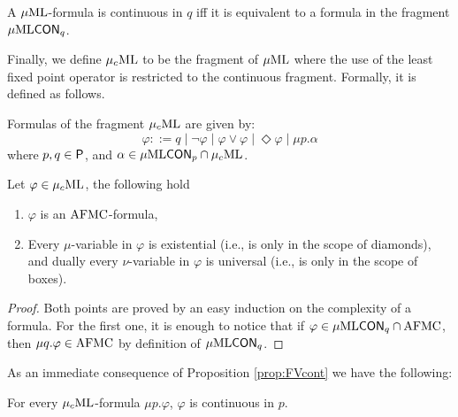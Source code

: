 \begin{proposition}\label{prop:FVcont}
A $\mu\mathrm{ML}$-formula is continuous in $q$ iff it is equivalent to a formula in the fragment $\mu\mathrm{ML}\mathsf{CON}_{q}$.
\end{proposition}

Finally, we define $\mu_{c}\textup{ML}$ to be the fragment of $\mu\mathrm{ML}$ where the use of the least fixed point operator is restricted to the continuous fragment. Formally, it is defined as follows.

\begin{definition}
Formulas of the fragment $\mu_{c}\textup{ML}$ are given by:%
\begin{equation*}
   \varphi ::= q \mid \lnot \varphi
    \mid \varphi \lor \varphi
    \mid \Diamond \varphi
    \mid \mu p.\alpha
\end{equation*}
%
where $p,q \in \mathsf{P}$, and $\alpha \in \mu\mathrm{ML}\mathsf{CON}_{p} \cap \mu_{c}\textup{ML}$.
\end{definition}

\begin{proposition}
Let $\varphi \in \mu_{c}\textup{ML}$, the following hold
\begin{enumerate}[(1)]
\itemsep 0pt
\item $\varphi$ is an $\mathrm{AFMC}$-formula,
\item Every $\mu$-variable in $\varphi$ is existential (i.e., is only in the scope of diamonds), and dually every $\nu$-variable in $\varphi$ is universal (i.e., is only in the scope of boxes).
\end{enumerate}
\end{proposition}
\begin{proof}
Both points are proved by an easy induction on the complexity of a formula. For the first one,  it is enough to notice that if $\varphi \in \mu\mathrm{ML}\mathsf{CON}_{q} \cap \mathrm{AFMC}$, then $\mu q. \varphi \in \mathrm{AFMC}$ by definition of $\mu\mathrm{ML}\mathsf{CON}_{q} $.
\end{proof}

As an immediate consequence of Proposition \ref{prop:FVcont} we have the following:

\begin{corollary}\label{cor:cont}
For every $\mu_{c}\textup{ML}$-formula $\mu p. \varphi$, $\varphi$ is continuous in $p$.
\end{corollary}


